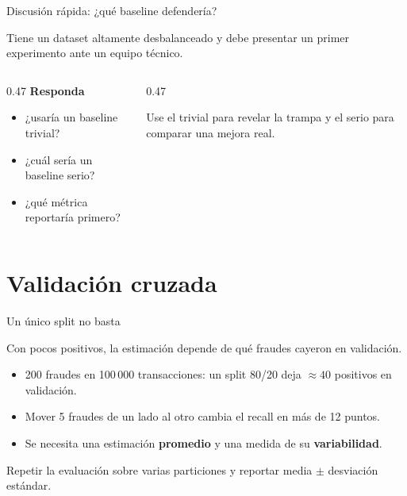 \documentclass[aspectratio=169,12pt]{beamer}
\newcommand{\colhead}[1]{\textbf{#1}\par\vspace{2pt}}
\begin{document}
\begin{frame}{Discusión rápida: ¿qué baseline defendería?}
  \begin{taskbox}
    Tiene un dataset altamente desbalanceado y debe presentar un primer experimento ante un equipo técnico.
  \end{taskbox}
  \vspace{6pt}
  \begin{columns}[T]
    \begin{column}{0.47\textwidth}
      \colhead{Responda}
      \begin{itemize}
        \item ¿usaría un baseline trivial?
        \item ¿cuál sería un baseline serio?
        \item ¿qué métrica reportaría primero?
      \end{itemize}
    \end{column}
    \begin{column}{0.47\textwidth}
      \begin{keybox}
        Use el trivial para revelar la trampa y el serio para comparar una mejora real.
      \end{keybox}
    \end{column}
  \end{columns}
\end{frame}

\section{Validación cruzada}

\begin{frame}{Un único split no basta}
  \begin{center}
    \large Con pocos positivos, la estimación depende de qué fraudes cayeron en validación.
  \end{center}
  \begin{itemize}
    \item 200 fraudes en 100\,000 transacciones: un split 80/20 deja $\approx 40$ positivos en validación.
    \item Mover 5 fraudes de un lado al otro cambia el recall en más de 12 puntos.
    \item Se necesita una estimación \textbf{promedio} y una medida de su \textbf{variabilidad}.
  \end{itemize}
  \begin{keybox}
    Repetir la evaluación sobre varias particiones y reportar media $\pm$ desviación estándar.
  \end{keybox}
\end{frame}
\end{document}

